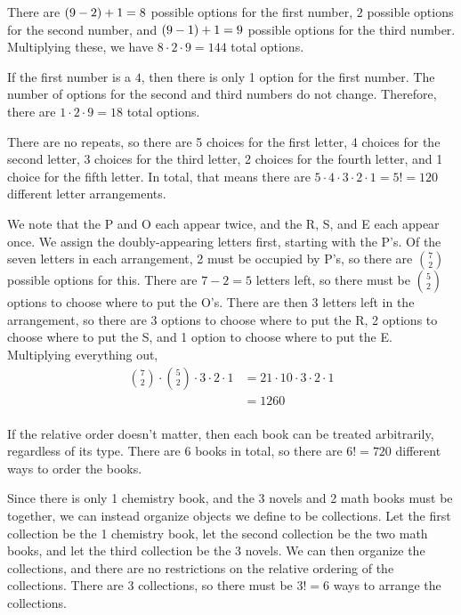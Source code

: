 \documentclass{article}
\begin{document}
\setcounter{problem}{4} 
\problem{}

There are $\left (9-2 \right)+1 = 8$ possible options for the first number, $2$ possible options for the second number, and $\left (9-1 \right)+1 = 9$ possible options for the third number.
Multiplying these, we have $8 \cdot 2 \cdot 9 = \boxed{144}$ total options.

If the first number is a $4$, then there is only 1 option for the first number.
The number of options for the second and third numbers do not change.
Therefore, there are $1 \cdot 2 \cdot 9 = \boxed{18}$ total options.



\setcounter{problem}{7}
\problem{}
\subproblema{}

There are no repeats, so there are 5 choices for the first letter, 4 choices for the second letter, 3 choices for the third letter, 2 choices for the fourth letter, and 1 choice for the fifth letter.
In total, that means there are $5 \cdot 4 \cdot 3 \cdot 2 \cdot 1 = 5! = \boxed{120}$ different letter arrangements.

\vspace{-4\parskip}
\subproblema{}
We note that the P and O each appear twice, and the R, S, and E each appear once.
We assign the doubly-appearing letters first, starting with the P's.
Of the seven letters in each arrangement, 2 must be occupied by P's, so there are
$\binom{7}{2}$ possible options for this.
There are $7-2=5$ letters left, so there must be $\binom{5}{2}$ options to choose where to put the O's.
There are then 3 letters left in the arrangement, so there are 3 options to choose where to put the R, 2 options to choose where to put the S, and 1 option to choose where to put the E.
Multiplying everything out,
\begin{align*}
  \binom{7}{2} \cdot \binom{5}{2} \cdot 3 \cdot 2 \cdot 1 &= 21 \cdot 10 \cdot 3 \cdot 2 \cdot 1 \\
                                                          &= \boxed{1260} \\
\end{align*}

\setcounter{problem}{10}
\vspace{-4\parskip}
\problem{}
\subproblema{}
If the relative order doesn't matter, then each book can be treated arbitrarily, regardless of its type.
There are 6 books in total, so there are $6! = \boxed{720}$ different ways to order the books.

\vspace{-4\parskip}
\subproblema{}
Since there is only 1 chemistry book, and the 3 novels and 2 math books must be together, we can instead organize objects we define to be collections.
Let the first collection be the 1 chemistry book, let the second collection be the two math books, and let the third collection be the 3 novels.
We can then organize the collections, and there are no restrictions on the relative ordering of the collections.
There are 3 collections, so there must be $3! = \boxed{6}$ ways to arrange the collections.
\end{document}
